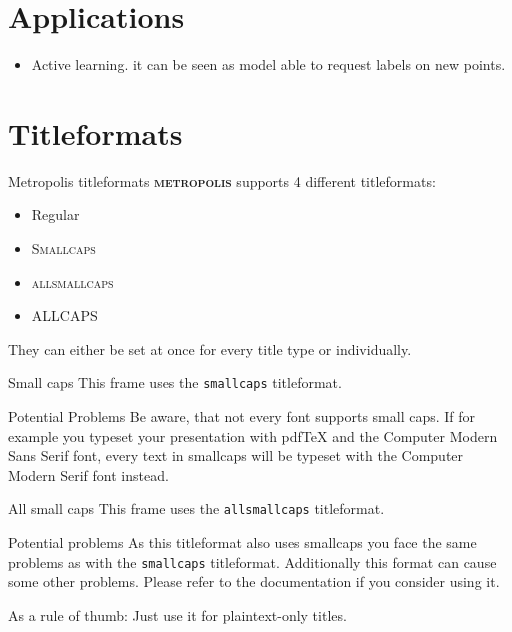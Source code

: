 \documentclass[10pt]{beamer}
\newcommand{\themename}{\textbf{\textsc{metropolis}}\xspace}
\begin{document}
\section{Applications}
\begin{frame}
	\begin{itemize}
		\item Active learning. it can be seen as model able to request labels on new points.
	\end{itemize}
\end{frame}

\section{Titleformats}

\begin{frame}{Metropolis titleformats}
	\themename supports 4 different titleformats:
	\begin{itemize}
		\item Regular
		\item \textsc{Smallcaps}
		\item \textsc{allsmallcaps}
		\item ALLCAPS
	\end{itemize}
	They can either be set at once for every title type or individually.
	
\end{frame}

{
\begin{frame}{Small caps}
	This frame uses the \texttt{smallcaps} titleformat.

	\begin{alertblock}{Potential Problems}
		Be aware, that not every font supports small caps. If for example you typeset your presentation with pdfTeX and the Computer Modern Sans Serif font, every text in smallcaps will be typeset with the Computer Modern Serif font instead.
	\end{alertblock}
\end{frame}
}

{
\begin{frame}{All small caps}
	This frame uses the \texttt{allsmallcaps} titleformat.

	\begin{alertblock}{Potential problems}
		As this titleformat also uses smallcaps you face the same problems as with the \texttt{smallcaps} titleformat. Additionally this format can cause some other problems. Please refer to the documentation if you consider using it.

		As a rule of thumb: Just use it for plaintext-only titles.
	\end{alertblock}
\end{frame}
}
\end{document}
